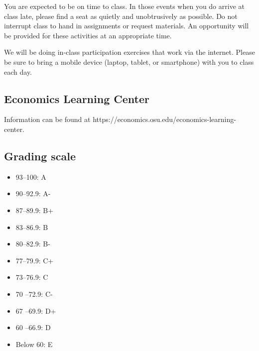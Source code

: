 \documentclass[12pt]{article}
\begin{document}
You are expected to be on time to class.
In those events when you do arrive at class late, please find a seat as quietly and unobtrusively as possible.
Do not interrupt class to hand in assignments or request materials.
An opportunity will be provided for these activities at an appropriate time.

We will be doing in-class participation exercises that work via the internet.
Please be sure to bring a mobile device (laptop, tablet, or smartphone) with you to class each day.

\subsection*{Economics Learning Center}

Information can be found at https://economics.osu.edu/economics-learning-center.

\subsection*{Grading scale}
\begin{itemize}
    \item 93–100: A
    \item 90–92.9: A-
    \item 87–89.9: B+
    \item 83–86.9: B
    \item 80–82.9: B-
    \item 77–79.9: C+
    \item 73–76.9: C
    \item 70 –72.9: C-
    \item 67 –69.9: D+
    \item 60 –66.9: D
    \item Below 60: E
\end{itemize}


\end{document}
